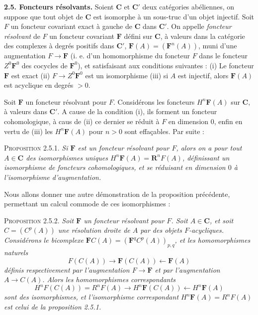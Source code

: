 
\textbf{2.5. Foncteurs résolvants.} 
Soient $\mathbf{C}$ et $\mathbf{C}'$ deux catégories abéliennes, on suppose que tout objet de
$\mathbf{C}$ est isomorphe à un sous-truc d'un objet injectif. Soit $F$ un foncteur
covariant exact à gauche de $\mathbf{C}$ dans $\mathbf{C}'$. On appelle \textit{foncteur
résolvant} de $F$ un foncteur covariant $\mathbf F$ défini sur $\mathbf{C}$, à valeurs
dans la catégorie des complexes à degrés positifs dans $\mathbf{C}'$,
$\mathbf F(A)=(\mathbf F^n(A))$, muni d'une augmentation
$F\to\mathbf F$ (i. e. d'un homomorphisme du foncteur $F$ dans
le foncteur $Z^0\mathbf F^0$ des cocycles de $\mathbf F^0$), et satisfaisant
aux conditions suivantes : (i) Le foncteur $\mathbf F$ est exact
(ii) $F\to Z^0\mathbf F^0$ est un isomorphisme (iii) si $A$ est
injectif, alors $\mathbf F(A)$ est acyclique en degrés $>0$.

Soit $\mathbf F$ un foncteur résolvant pour $F$. Considérons les foncteurs
$H^n\mathbf F(A)$ sur $\mathbf{C}$, à valeurs dans $\mathbf{C}'$. A cause de la condition (i),
ils forment un foncteur cohomologique, à caus de (ii) ce dernier se réduit à
$F$ en dimension 0, enfin en vertu de (iii) les $H^n\mathbf F(A)$ pour $n>0$
sont effaçables. Par suite :

\textsc{Proposition 2.5.1.} \textit{Si $\mathbf F$ est un
foncteur résolvant pour $F$, alors on a pour tout $A\in \mathbf{C}$ des isomorphismes
uniques $H^n\mathbf F(A)=\mathbf{R}^nF(A)$, définissant un isomorphisme de foncteurs
cohomologiques, et se réduisant en dimension $0$ à l'isomorphisme
d'augmentation.}

Nous allons donner une autre démonstration de la proposition précédente,
permettant un calcul commode de ces isomorphismes :

\textsc{Proposition 2.5.2.} \textit{Soit $\mathbf F$ un foncteur
résolvant pour $F$. Soit $A\in \mathbf{C}$, et soit $C=(C^p(A))$ une résolution droite
de $A$ par des objets $F$-acycliques. Considérons le bicomplexe
$\mathbf F C(A)=(\mathbf F^qC^p(A))_{p,q}$, et les homomorphismes naturels}
\[
\tag{2.5.1}
F(C(A))\to\mathbf F(C(A))\leftarrow\mathbf F(A)
\]
\textit{définis respectivement par l'augmentation
$F\to\mathbf F$ et par l'augmentation
$A\to C(A)$. Alors les homomorphismes correspondants}
\[
\tag{2.5.2}
H^nF(C(A))=R^nF(A)\to H^n\mathbf F(C(A))
\leftarrow H^n\mathbf F(A)
\]
\textit{sont des isomorphismes, et l'isomorphisme correspondant
$H^n\mathbf F(A)=R^nF(A)$ est celui de la proposition \textup{2.5.1.}}

